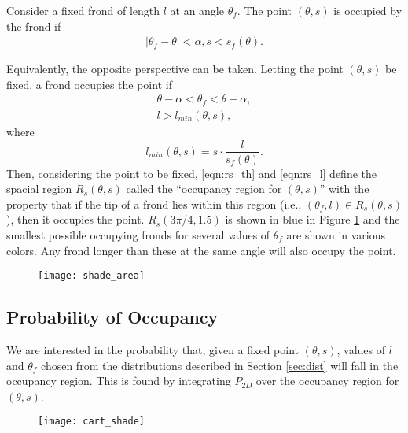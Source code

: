 Consider a fixed frond of length $l$ at an angle $\theta_f$. The point
$(\theta,s)$ is occupied by the frond if
\begin{align*}
	\left|\theta_f - \theta \right| < \alpha,
	s < s_f(\theta).
\end{align*}

Equivalently, the opposite perspective can be taken.
Letting the point $(\theta,s)$ be fixed, a frond occupies the point if
\begin{align}
	\theta - \alpha < \theta_f < \theta + \alpha,
	\label{eqn:rs_th} \\
	l > l_{min}(\theta,s),
	\label{eqn:rs_l}
\end{align}
where
\begin{equation*}
	l_{min}(\theta,s) = s \cdot \frac{l}{s_f(\theta)}.
\end{equation*}
Then, considering the point to be fixed, \eqref{eqn:rs_th} and \eqref{eqn:rs_l} define the spacial region $R_s(\theta,s)$ called the ``occupancy region for $(\theta,s)$'' with the property that if the tip of a frond lies within this region (i.e., $(\theta_f,l) \in R_s(\theta,s)$), then it occupies the point.
$R_s(3\pi/4,1.5)$ is shown in blue in Figure \ref{fig:shade_area} and the smallest possible occupying fronds for several values of $\theta_f$ are shown in various colors.
Any frond longer than these at the same angle will also occupy the point.

\begin{figure}[h]
	\centering
	\texttt{[image: shade\_area]}
	\label{fig:shade_area}
\end{figure}

\subsection{Probability of Occupancy}
We are interested in the probability that, given a fixed point $(\theta,s)$, values of $l$ and $\theta_f$ chosen from the distributions described in Section \ref{sec:dist} will fall in the occupancy region.
This is found by integrating $P_{2D}$ over the occupancy region for $(\theta,s)$.

\begin{figure}[h]
	\centering
	\texttt{[image: cart\_shade]}
	\label{fig:cart_shade}
\end{figure}

